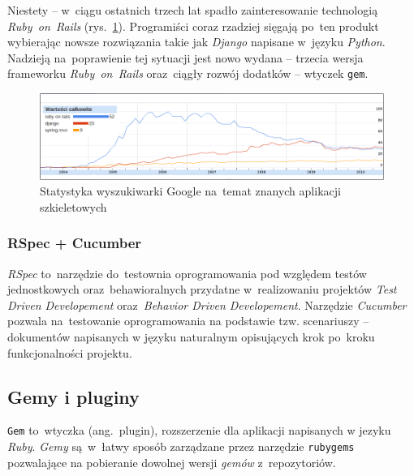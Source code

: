 Niestety -- w~ciągu ostatnich trzech lat spadło zainteresowanie technologią \textit{Ruby~on~Rails} (rys.~\ref{fig.wykres.googleresearch}). Programiści coraz rzadziej sięgają po~ten produkt wybierając nowsze rozwiązania takie jak \textit{Django}\cite{django} napisane w~języku \textit{Python}\cite{python}. Nadzieją na~poprawienie tej sytuacji jest nowo wydana -- trzecia wersja frameworku \textit{Ruby~on~Rails} oraz~ciągły rozwój dodatków -- wtyczek \texttt{gem}.

\begin{figure}[!t]
\centering
\includegraphics[width=\textwidth]{obrazki/googleresearch.png}
\caption[Statystyki Google na temat aplikacji szkieletowych]{Statystyka wyszukiwarki Google na~temat znanych aplikacji szkieletowych\cite{google.stats}}
\label{fig.wykres.googleresearch}
\end{figure}

\subsubsection{RSpec + Cucumber}

\textit{RSpec}\cite{rspec} to~narzędzie do~testownia oprogramowania pod względem testów jednostkowych oraz~behawioralnych przydatne w~realizowaniu projektów \textit{Test Driven Developement} oraz~\textit{Behavior Driven Developement}. Narzędzie \textit{Cucumber}\cite{cucumber} pozwala na~testowanie oprogramowania na podstawie tzw. scenariuszy -- dokumentów napisanych w języku naturalnym opisujących krok po~kroku funkcjonalności projektu.


\subsection{Gemy i pluginy} \label{technologie.gemy}

\texttt{Gem} to~wtyczka (ang.~plugin), rozszerzenie dla aplikacji napisanych w jezyku \textit{Ruby}. \textit{Gemy} są~w~łatwy sposób zarządzane przez narzędzie \texttt{rubygems} pozwalające na pobieranie dowolnej wersji \textit{gemów} z~repozytoriów.


